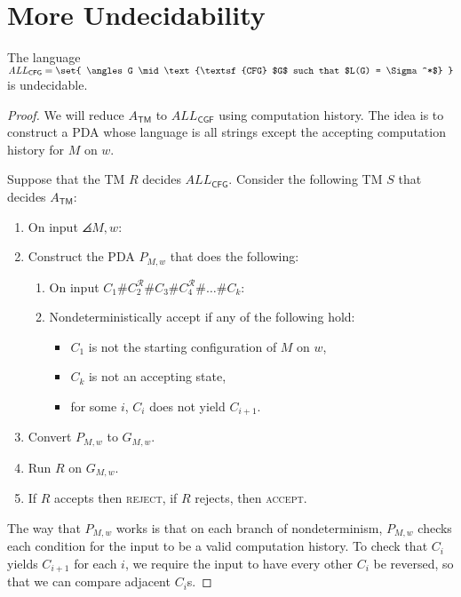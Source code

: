 \documentclass{standalone}
\begin{document}
\section{More Undecidability}
\begin{proposition}
  The language \(\mathit{ALL}_{\textsf{CFG}} = \set{
    \angles G \mid \text{\textsf{CFG} $G$ such that $L(G) = \Sigma^*$}
  }\) is undecidable.
\end{proposition}
\begin{proof}
  We will reduce \(A_{\textsf{TM}}\) to \(\textit{ALL}_{\textsf{CGF}}\) using computation history. The idea is to construct a \textsf{PDA} whose language is all strings except the accepting computation history for \(M\) on \(w\).

  Suppose that the \textsf{TM} \(R\) decides \(\textit{ALL}_{\textsf{CFG}}\). Consider the following \textsf{TM} \(S\) that decides \(A_{\textsf{TM}}\):
  \begin{enumerate}[start=0]
    \item On input \(\angles{M, w}\):
    \item Construct the \textsf{PDA} \(P_{M, w}\) that does the following:
    \begin{enumerate}[(1), start=0, nosep]
      \item On input \(C_1 \texttt\# C_2^{\mathcal R} \texttt\# C_3 \texttt\# C_4^{\mathcal R} \texttt\# \dots \texttt\# C_k\):
      \item Nondeterministically accept if any of the following hold:
      \begin{itemize}[nosep]
        \item \(C_1\) is not the starting configuration of \(M\) on \(w\),
        \item \(C_k\) is not an accepting state,
        \item for some \(i\), \(C_i\) does not yield \(C_{i + 1}\).
      \end{itemize}
    \end{enumerate}
    \item Convert \(P_{M, w}\) to \(G_{M, w}\).
    \item Run \(R\) on \(G_{M, w}\).
    \item If \(R\) accepts then \textsc{reject}, if \(R\) rejects, then \textsc{accept}.
  \end{enumerate}

  The way that \(P_{M, w}\) works is that on each branch of nondeterminism, \(P_{M, w}\) checks each condition for the input to be a valid computation history. To check that \(C_i\) yields \(C_{i + 1}\) for each \(i\), we require the input to have every other \(C_i\) be reversed, so that we can compare adjacent \(C_i\)s.
\end{proof}
\end{document}
